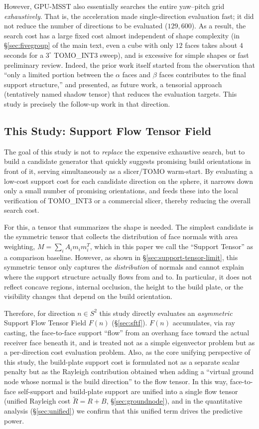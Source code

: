 \documentclass[11pt,a4paper]{article}
\begin{document}
However, GPU-MSST also essentially searches the entire yaw--pitch grid \emph{exhaustively}.
That is, the acceleration made single-direction evaluation fast; it did not reduce the number of directions to be evaluated ($129{,}600$).
As a result, the search cost has a large fixed cost almost independent of shape complexity
(in \S\ref{sec:fivegroup} of the main text, even a cube with only $12$ faces takes about $4$ seconds for a $3^\circ$ TOMO\_INT3 sweep),
and is excessive for simple shapes or fast preliminary review.
Indeed, the prior work itself started from the observation that ``only a limited portion between the $\alpha$ faces and $\beta$ faces contributes to the final support structure,''
and presented, as future work, a tensorial approach (tentatively named shadow tensor) that reduces the evaluation targets.
This study is precisely the follow-up work in that direction.

\subsection{This Study: Support Flow Tensor Field}

The goal of this study is not to \emph{replace} the expensive exhaustive search, but to build a candidate generator
that quickly suggests promising build orientations in front of it, serving simultaneously as a slicer/TOMO warm-start.
By evaluating a low-cost support cost for each candidate direction on the sphere, it narrows down only a small number of promising orientations,
and feeds these into the local verification of TOMO\_INT3 or a commercial slicer, thereby reducing the overall search cost.

For this, a tensor that summarizes the shape is needed.
The simplest candidate is the symmetric tensor that collects the distribution of face normals with area weighting,
$M=\sum_i A_i m_i m_i^T$, which in this paper we call the ``Support Tensor'' as a comparison baseline.
However, as shown in \S\ref{sec:support-tensor-limit}, this symmetric tensor only captures the \emph{distribution} of normals
and cannot explain where the support structure actually flows from and to.
In particular, it does not reflect concave regions, internal occlusion, the height to the build plate,
or the visibility changes that depend on the build orientation.

Therefore, for direction $n\in S^2$ this study directly evaluates an \emph{asymmetric} Support Flow Tensor Field $F(n)$
(\S\ref{sec:sftf}).
$F(n)$ accumulates, via ray casting, the face-to-face support ``flow'' from an overhang face toward the actual receiver face beneath it,
and is treated not as a simple eigenvector problem but as a per-direction cost evaluation problem.
Also, as the core unifying perspective of this study, the build-plate support cost is formulated not as a separate scalar penalty but as
the Rayleigh contribution obtained when adding a ``virtual ground node whose normal is the build direction'' to the flow tensor.
In this way, face-to-face self-support and build-plate support are unified into a single flow tensor
(unified Rayleigh cost $\tilde R=R+B$, \S\ref{sec:groundnode}),
and in the quantitative analysis (\S\ref{sec:unified}) we confirm that this unified term drives the predictive power.
\end{document}
